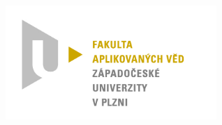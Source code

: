 \begin{titlepage}
	\includegraphics[width=80mm,scale=0.5]{img/logo.jpg}\\[1cm] %
		 
		
	\vfill %
		
\end{titlepage}